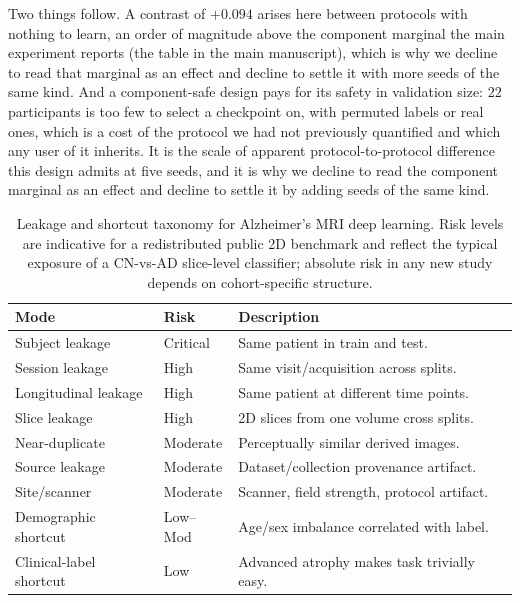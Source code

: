 \documentclass[11pt]{article}
\begin{document}
Two things follow. A contrast of $+0.094$ arises here between protocols
with nothing to learn, an order of magnitude above the
\AdniMarginal{} component marginal the main experiment reports
(the table in the main manuscript), which is why we decline to read that
marginal as an effect and decline to settle it with more seeds of the
same kind. And a component-safe design pays for its safety in
validation size: $22$ participants is too few to select a checkpoint on,
with permuted labels or real ones, which is a cost of the protocol we
had not previously quantified and which any user of it inherits. It is the scale of apparent
protocol-to-protocol difference this design admits at five seeds, and it
is why we decline to read the component marginal as an effect and decline
to settle it by adding seeds of the same kind.





\begin{table}[!ht]
\centering
\caption{Leakage and shortcut taxonomy for Alzheimer's MRI deep learning.
         Risk levels are indicative for a redistributed public 2D benchmark
         and reflect the typical exposure of a CN-vs-AD slice-level
         classifier; absolute risk in any new study depends on
         cohort-specific structure.}
\label{sm:tab:taxonomy}
\begin{tabular}{llp{6cm}}
\toprule
\textbf{Mode} & \textbf{Risk} & \textbf{Description} \\
\midrule
Subject leakage     & Critical & Same patient in train and test. \\
Session leakage     & High     & Same visit/acquisition across splits. \\
Longitudinal leakage& High     & Same patient at different time points. \\
Slice leakage       & High     & 2D slices from one volume cross splits. \\
Near-duplicate      & Moderate & Perceptually similar derived images. \\
Source leakage      & Moderate & Dataset/collection provenance artifact. \\
Site/scanner        & Moderate & Scanner, field strength, protocol artifact. \\
Demographic shortcut& Low--Mod  & Age/sex imbalance correlated with label. \\
Clinical-label shortcut& Low   & Advanced atrophy makes task trivially easy. \\
\bottomrule
\end{tabular}
\end{table}
\end{document}
